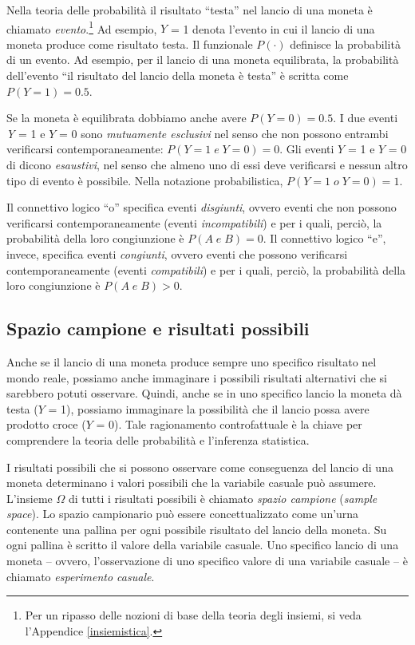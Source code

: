 \documentclass[
  11pt,
]{krantz}
\theoremstyle{definition}
\theoremstyle{definition}
\theoremstyle{definition}
\theoremstyle{definition}
\theoremstyle{remark}
\begin{document}
Nella teoria delle probabilità il risultato ``testa'' nel lancio di una moneta è chiamato \emph{evento}.\footnote{Per un ripasso delle nozioni di base della teoria degli insiemi, si veda l'Appendice \ref{insiemistica}.} Ad esempio, \(Y\) = 1 denota l'evento in cui il lancio di una moneta produce come risultato testa. Il funzionale \(P(·)\) definisce la probabilità di un evento. Ad esempio, per il lancio di una moneta equilibrata, la probabilità dell'evento ``il risultato del lancio della moneta è testa'' è scritta come \(P(Y = 1) = 0.5.\)

Se la moneta è equilibrata dobbiamo anche avere \(P(Y = 0) = 0.5\). I due eventi \emph{Y} = 1 e \(Y\) = 0 sono \emph{mutuamente esclusivi} nel senso che non possono entrambi verificarsi contemporaneamente: \(P(Y = 1\; e \; Y = 0) = 0.\) Gli eventi \(Y\) = 1 e \(Y\) = 0 di dicono \emph{esaustivi}, nel senso che almeno uno di essi deve verificarsi e nessun altro tipo di evento è possibile. Nella notazione probabilistica, \(P(Y = 1\; o \; Y = 0) = 1.\)

Il connettivo logico ``o'' specifica eventi \emph{disgiunti}, ovvero eventi che non possono verificarsi contemporaneamente (eventi \emph{incompatibili}) e per i quali, perciò, la probabilità della loro congiunzione è \(P(A \; e \; B) = 0\). Il connettivo logico ``e'', invece, specifica eventi \emph{congiunti}, ovvero eventi che possono verificarsi contemporaneamente (eventi \emph{compatibili}) e per i quali, perciò, la probabilità della loro congiunzione è \(P(A \; e \; B) > 0\).

\hypertarget{spazio-campione-e-risultati-possibili}{%
\subsection{Spazio campione e risultati possibili}\label{spazio-campione-e-risultati-possibili}}

Anche se il lancio di una moneta produce sempre uno specifico risultato nel mondo reale, possiamo anche immaginare i possibili risultati alternativi che si sarebbero potuti osservare. Quindi, anche se in uno specifico lancio la moneta dà testa (\(Y\) = 1), possiamo immaginare la possibilità che il lancio possa avere prodotto croce (\(Y\) = 0). Tale ragionamento controfattuale è la chiave per comprendere la teoria delle probabilità e l'inferenza statistica.

I risultati possibili che si possono osservare come conseguenza del lancio di una moneta determinano i valori possibili che la variabile casuale può assumere. L'insieme \(\Omega\) di tutti i risultati possibili è chiamato \emph{spazio campione} (\emph{sample space}). Lo spazio campionario può essere concettualizzato come un'urna contenente una pallina per ogni possibile risultato del lancio della moneta. Su ogni pallina è scritto il valore della variabile casuale. Uno specifico lancio di una moneta -- ovvero, l'osservazione di uno specifico valore di una variabile casuale -- è chiamato \emph{esperimento casuale}.
\end{document}
